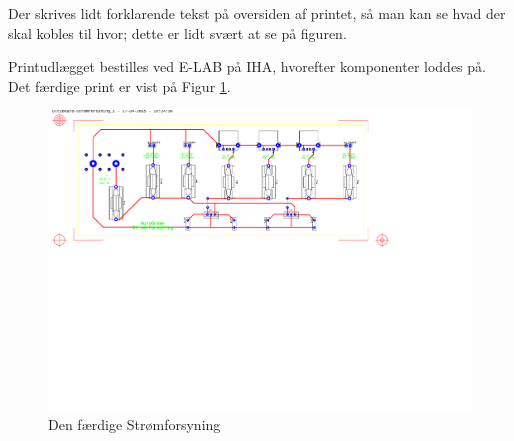 Der skrives lidt forklarende tekst på oversiden af printet, så man kan se hvad der skal kobles til hvor; dette er lidt svært at se på figuren.
\newline

Printudlægget bestilles ved E-LAB på IHA, hvorefter komponenter loddes på.
Det færdige print er vist på Figur \ref{fig:stroemforsyning_print}.

\begin{figure}[h]
\centering 
\includegraphics[width={\textwidth}, trim=0 0 0 0, clip=true] {../fig/ultiboard_stroemforsyning.pdf} %
\caption{Den færdige Strømforsyning}
\label{fig:stroemforsyning_print}
\end{figure} 

